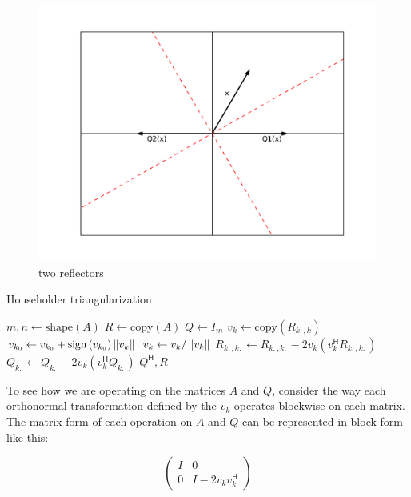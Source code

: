 \begin{figure}
\includegraphics[width= \textwidth]{fig2}
\caption{two reflectors}
\label{fig:two reflectors}
\end{figure}

\begin{algorithm}
\caption{Householder triangularization}
\label{Alg:Householder}
\begin{algorithmic}[1]
\State $m, n \gets \text{shape} \left( A \right)$
\State $R \gets \text{copy} \left( A \right)$
\State $Q \gets I_m$
    \State $v_k \gets \text{copy} \left( R_{k:,k} \right)$
    \State $v_{k_0} \gets v_{k_0} + \text{sign} \left( v_{k_0} \right) \left\lVert v_k\right\rVert$
    \State $v_k \gets v_k / \left\lVert v_k\right\rVert$
    \State $R_{k:,k:} \gets R_{k:,k:} - 2 v_k \left( v_k^\mathsf{H} R_{k:,k:} \right)$
    \State $Q_{k:} \gets Q_{k:} - 2 v_k \left( v_k^\mathsf{H} Q_{k:} \right)$
\EndFor
\State {} $Q^\mathsf{H}, R$
\EndProcedure
\end{algorithmic}
\end{algorithm}

To see how we are operating on the matrices $A$ and $Q$, consider the way each orthonormal transformation defined by the $v_k$ operates blockwise on each matrix.
The matrix form of each operation on $A$ and $Q$ can be represented in block form like this:

\[
\begin{pmatrix}
I & 0 \\
0 & I - 2 v_k v_k^\mathsf{H}
\end{pmatrix}
\]

